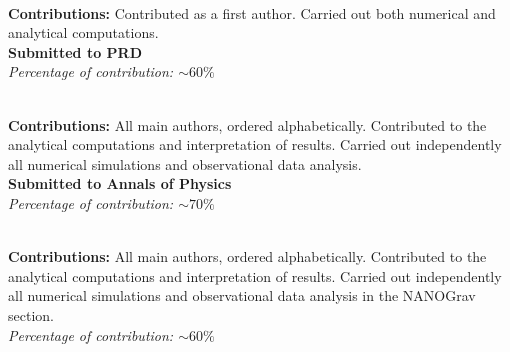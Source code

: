 \documentclass[letterpaper,11pt]{article}
\begin{document}
\begin{enumerate}[label={[\arabic*]}]
\item\indent{}\\
\textbf{Contributions:} Contributed as a first author. Carried out both numerical and analytical computations. \\
\textbf{Submitted to PRD}\\
\textit{Percentage of contribution: $\sim 60\%$}

\item\indent{}\\
\textbf{Contributions:} All main authors, ordered alphabetically. Contributed to the analytical computations and interpretation of results. Carried out independently all numerical simulations and observational data analysis.\\
\textbf{Submitted to Annals of Physics}\\
\textit{Percentage of contribution: $\sim 70\%$}

\item\indent{}\\
\textbf{Contributions:} All main authors, ordered alphabetically. Contributed to the analytical computations and interpretation of results. Carried out independently all numerical simulations and observational data analysis in the NANOGrav section.
\\
\textit{Percentage of contribution: $\sim 60\%$}


\end{enumerate}
\end{document}
